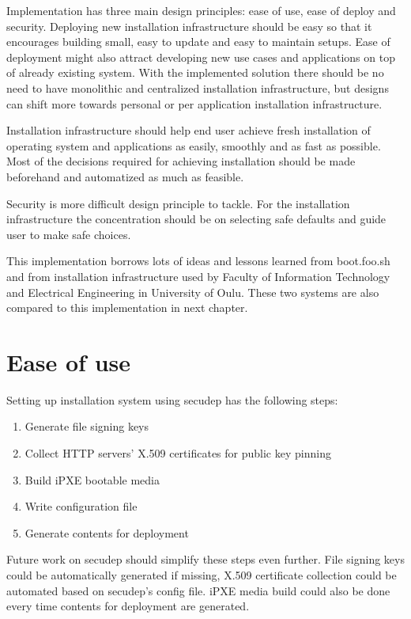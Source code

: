 
Implementation has three main design principles: ease of use, ease of
deploy and security. Deploying new installation infrastructure should
be easy so that it encourages building small, easy to update and easy
to maintain setups. Ease of deployment might also attract developing
new use cases and applications on top of already existing system. With
the implemented solution there should be no need to have monolithic
and centralized installation infrastructure, but designs can shift
more towards personal or per application installation infrastructure.

Installation infrastructure should help end user achieve fresh
installation of operating system and applications as easily, smoothly
and as fast as possible. Most of the decisions required for achieving
installation should be made beforehand and automatized as much as
feasible.

Security is more difficult design principle to tackle. For the
installation infrastructure the concentration should be on selecting
safe defaults and guide user to make safe choices.

This implementation borrows lots of ideas and lessons learned from
boot.foo.sh\cite{boot-foo-sh} and from installation infrastructure
used by Faculty of Information Technology and Electrical Engineering
in University of Oulu. These two systems are also compared to this
implementation in next chapter.

\section{Ease of use}

Setting up installation system using secudep has the following steps:

\begin{enumerate}
  \item Generate file signing keys
  \item Collect HTTP servers' X.509 certificates for public key pinning
  \item Build iPXE bootable media
  \item Write configuration file
  \item Generate contents for deployment
\end{enumerate}

Future work on secudep should simplify these steps even further. File
signing keys could be automatically generated if missing, X.509
certificate collection could be automated based on secudep's config
file. iPXE media build could also be done every time contents for
deployment are generated.

